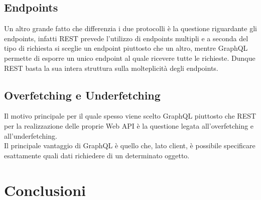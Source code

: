 \subsection{Endpoints}
Un altro grande fatto che differenzia i due protocolli è la questione riguardante gli endpoints, infatti REST prevede l'utilizzo di endpoints multipli e a seconda del tipo di richiesta si sceglie un endpoint piuttosto che un altro, mentre GraphQL permette di esporre un unico endpoint al quale ricevere tutte le richieste. Dunque REST basta la sua intera struttura sulla molteplicità degli endpoints.\\

\subsection{Overfetching e Underfetching}
Il motivo principale per il quale spesso viene scelto GraphQL piuttosto che REST per la realizzazione delle proprie Web API è la questione legata all'overfetching e all'underfetching.\\
Il principale vantaggio di GraphQL è quello che, lato client, è possibile specificare esattamente quali dati richiedere di un determinato oggetto.
\section{Conclusioni}





